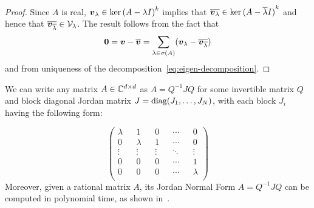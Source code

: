\begin{proof}
Since $A$ is real, $\boldsymbol{v}_{\lambda}\in \ker{(A-\lambda I)}^{k}$
  implies that
  $\overline{\boldsymbol{v}_{\lambda}} \in \ker{(A-\overline{\lambda}
  I)}^{k}$
  and hence that
  $\overline{ \boldsymbol{v}_{ \overline{\lambda}}} \in
  \mathcal{V}_{\lambda}$.  The result follows from the fact that
\begin{align*}
\boldsymbol{0}=\boldsymbol{v}-\overline{\boldsymbol{v}}=\sum\limits_{\lambda\in \sigma(A)}(\boldsymbol{v}_{\lambda}-\overline{ \boldsymbol{v}_{ \overline{\lambda}}})
\end{align*}
and from uniqueness of the decomposition~\eqref{eq:eigen-decomposition}.
%
%
\end{proof}

We can write any matrix $A \in \mathbb{C}^{d \times d}$ as $A=Q^{-1}JQ$ for some
invertible matrix $Q$ and block diagonal Jordan matrix
$J=\operatorname{diag}(J_{1},\ldots,J_{N})$, with each block $J_{i}$ having the
following form:

\begin{equation*}
\begin{pmatrix}
\lambda	&&	1		&&	0		&&	\cdots	&&	0		\\
0		&&	\lambda	&&	1		&&	\cdots	&&	0		\\
\vdots	&&	\vdots	&&	\vdots	&&	\ddots	&&	\vdots	\\
0		&&	0		&&	0		&&	\cdots	&&	1		\\
0		&&	0		&&	0		&&	\cdots	&&	\lambda	\\
\end{pmatrix}
\end{equation*}
Moreover, given a rational matrix $A$, its Jordan Normal Form $A=Q^{-1}JQ$ can be
computed in polynomial time, as shown in~\cite{Cai94}.

